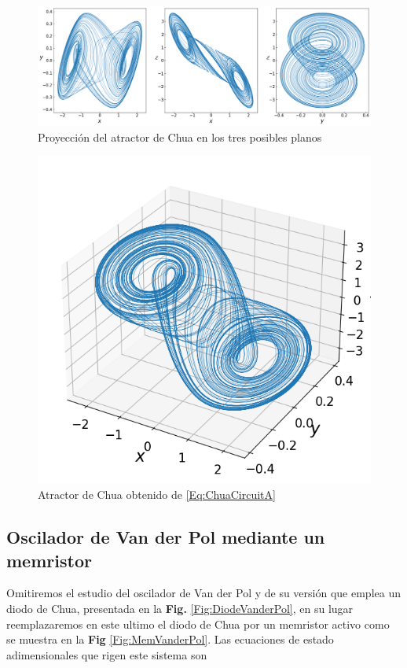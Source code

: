 \documentclass[11pt,letterpaper]{article}
\begin{document}
\begin{multicols*}{2}
\begin{figure}[H]
    \centering
    \includegraphics[scale=0.205]{ChuaOscillator2D.png}
    \caption{Proyección del atractor de Chua en los tres posibles planos}
    \label{Fig:ChuaCircuit2D}
\end{figure}

\begin{figure}[H]
    \centering
    \includegraphics[scale=0.38]{ChuaOscillator3D.png}
    \caption{Atractor de Chua obtenido de \ref{Eq:ChuaCircuitA}}
    \label{Fig:ChuaCircuit3D}
\end{figure}

\subsection*{Oscilador de Van der Pol mediante un memristor}

Omitiremos el estudio del oscilador de Van der Pol y de su versión que emplea un diodo de Chua, presentada en la \textbf{Fig.} \ref{Fig:DiodeVanderPol}, en su lugar reemplazaremos en este ultimo el diodo de Chua por un memristor activo como se muestra en la \textbf{Fig} \ref{Fig:MemVanderPol}. Las ecuaciones de estado adimensionales que rigen este sistema son 


\end{multicols*}
\end{document}
